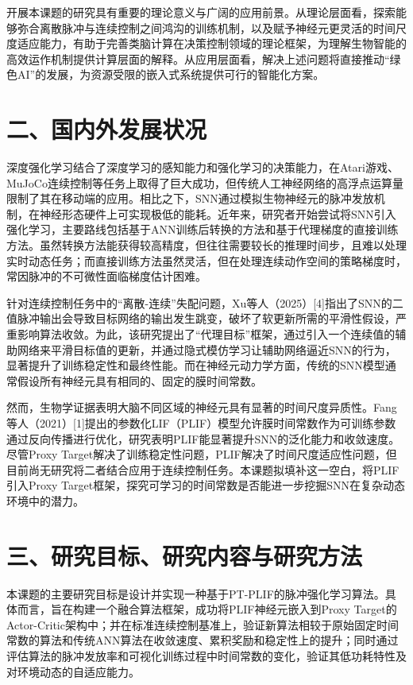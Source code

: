 \documentclass[UTF8,12pt,a4paper]{ctexart}
\begin{document}
开展本课题的研究具有重要的理论意义与广阔的应用前景。从理论层面看，探索能够弥合离散脉冲与连续控制之间鸿沟的训练机制，以及赋予神经元更灵活的时间尺度适应能力，有助于完善类脑计算在决策控制领域的理论框架，为理解生物智能的高效运作机制提供计算层面的解释。从应用层面看，解决上述问题将直接推动“绿色AI”的发展，为资源受限的嵌入式系统提供可行的智能化方案。

\section*{二、国内外发展状况}
深度强化学习结合了深度学习的感知能力和强化学习的决策能力，在Atari游戏、MuJoCo连续控制等任务上取得了巨大成功，但传统人工神经网络的高浮点运算量限制了其在移动端的应用。相比之下，SNN通过模拟生物神经元的脉冲发放机制，在神经形态硬件上可实现极低的能耗。近年来，研究者开始尝试将SNN引入强化学习，主要路线包括基于ANN训练后转换的方法和基于代理梯度的直接训练方法。虽然转换方法能获得较高精度，但往往需要较长的推理时间步，且难以处理实时动态任务；而直接训练方法虽然灵活，但在处理连续动作空间的策略梯度时，常因脉冲的不可微性面临梯度估计困难。

针对连续控制任务中的“离散-连续”失配问题，Xu等人（2025）[4]指出了SNN的二值脉冲输出会导致目标网络的输出发生跳变，破坏了软更新所需的平滑性假设，严重影响算法收敛。为此，该研究提出了“代理目标”框架，通过引入一个连续值的辅助网络来平滑目标值的更新，并通过隐式模仿学习让辅助网络逼近SNN的行为，显著提升了训练稳定性和最终性能。而在神经元动力学方面，传统的SNN模型通常假设所有神经元具有相同的、固定的膜时间常数。

然而，生物学证据表明大脑不同区域的神经元具有显著的时间尺度异质性。Fang等人（2021）[1]提出的参数化LIF（PLIF）模型允许膜时间常数作为可训练参数通过反向传播进行优化，研究表明PLIF能显著提升SNN的泛化能力和收敛速度。尽管Proxy Target解决了训练稳定性问题，PLIF解决了时间尺度适应性问题，但目前尚无研究将二者结合应用于连续控制任务。本课题拟填补这一空白，将PLIF引入Proxy Target框架，探究可学习的时间常数是否能进一步挖掘SNN在复杂动态环境中的潜力。

\section*{三、研究目标、研究内容与研究方法}
本课题的主要研究目标是设计并实现一种基于PT-PLIF的脉冲强化学习算法。具体而言，旨在构建一个融合算法框架，成功将PLIF神经元嵌入到Proxy Target的Actor-Critic架构中；并在标准连续控制基准上，验证新算法相较于原始固定时间常数的算法和传统ANN算法在收敛速度、累积奖励和稳定性上的提升；同时通过评估算法的脉冲发放率和可视化训练过程中时间常数的变化，验证其低功耗特性及对环境动态的自适应能力。
\end{document}

